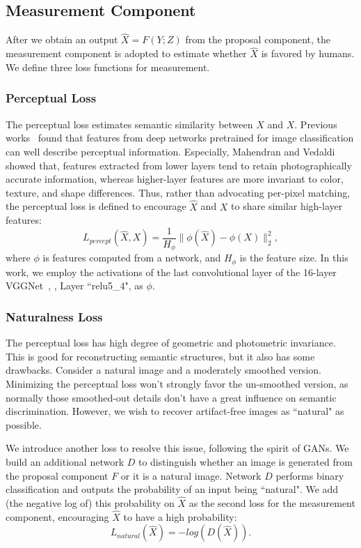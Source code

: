 \documentclass[10pt,twocolumn,letterpaper]{article}
\begin{document}
\subsection{Measurement Component}
After we obtain an output $\hat{X} = F(Y; Z)$ from the proposal component, the measurement component is adopted to estimate whether $\hat{X}$ is favored by humans. We define three loss functions for measurement.

\subsubsection{Perceptual Loss}
The perceptual loss estimates semantic similarity between $\hat{X}$ and $X$. Previous works~\cite{artistic_style,style_transfer,perceptual_losses} found that features from deep networks pretrained for image classification can well describe perceptual information. Especially, Mahendran and Vedaldi~\cite{feature_inversion} showed that, features extracted from lower layers tend to retain photographically accurate information, whereas higher-layer features are more invariant to color, texture, and shape differences. Thus, rather than advocating per-pixel matching, the perceptual loss is defined to encourage $\hat{X}$ and $X$ to share similar high-layer features:
\begin{equation}
L_{percept}(\hat{X}, X) = \frac{1}{H_\phi}\lVert\phi(\hat{X}) - \phi(X)\rVert_2^2,
\end{equation}
where $\phi$ is features computed from a network, and $H_\phi$ is the feature size. In this work, we employ the activations of the last convolutional layer of the 16-layer VGGNet~\cite{vggnet}, \ie, Layer ``relu5\_4", as $\phi$.

\subsubsection{Naturalness Loss}
The perceptual loss has high degree of geometric and photometric invariance. This is good for reconstructing semantic structures, but it also has some drawbacks. Consider a natural image and a moderately smoothed version. Minimizing the perceptual loss won't strongly favor the un-smoothed version, as normally those smoothed-out details don't have a great influence on semantic discrimination. However, we wish to recover artifact-free images as ``natural" as possible.

We introduce another loss to resolve this issue, following the spirit of GANs. We build an additional network $D$ to distinguish whether an image is generated from the proposal component $F$ or it is a natural image. Network $D$ performs binary classification and outputs the probability of an input being ``natural". We add (the negative log of) this probability on $\hat{X}$ as the second loss for the measurement component, encouraging $\hat{X}$ to have a high probability:
\begin{equation}
L_{natural}(\hat{X}) = -log(D(\hat{X})).
\label{eq:g_loss}
\end{equation}
\end{document}
